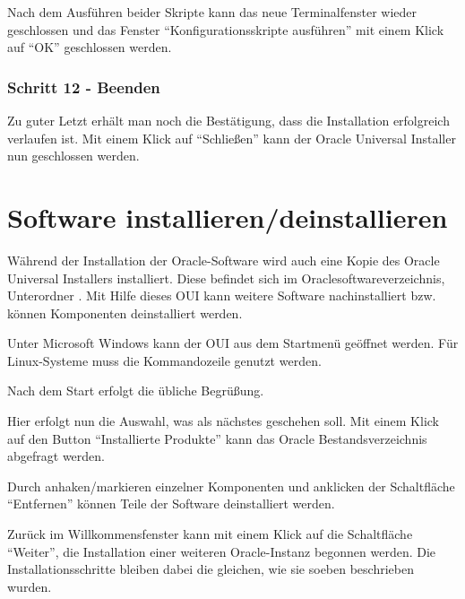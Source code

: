           Nach dem Ausführen beider Skripte kann das neue Terminalfenster wieder geschlossen und das Fenster \enquote{Konfigurationsskripte ausführen} mit einem Klick auf \enquote{OK} geschlossen werden.


\clearpage
        \subsubsection{Schritt 12 - Beenden}
          Zu guter Letzt erhält man noch die Bestätigung, dass die Installation erfolgreich verlaufen ist. Mit einem Klick auf \enquote{Schließen} kann der Oracle Universal Installer nun geschlossen werden.
    \section{Software installieren/deinstallieren}
      Während der Installation der Oracle-Software wird auch eine Kopie des Oracle Universal Installers installiert. Diese befindet sich im Oraclesoftwareverzeichnis, Unterordner . Mit Hilfe dieses OUI kann weitere Software nachinstalliert bzw. können Komponenten deinstalliert werden.

      Unter Microsoft Windows kann der OUI aus dem Startmenü geöffnet werden. Für Linux-Systeme muss die Kommandozeile genutzt werden.


      Nach dem Start erfolgt die übliche Begrüßung.

      Hier erfolgt nun die Auswahl, was als nächstes geschehen soll. Mit einem Klick auf den Button \enquote{Installierte Produkte} kann das Oracle Bestandsverzeichnis abgefragt werden.

      Durch anhaken/markieren einzelner Komponenten und anklicken der Schaltfläche \enquote{Entfernen} können Teile der Software deinstalliert werden.

      Zurück im Willkommensfenster kann mit einem Klick auf die Schaltfläche \enquote{Weiter}, die Installation einer weiteren Oracle-Instanz begonnen werden. Die Installationsschritte bleiben dabei die gleichen, wie sie soeben beschrieben wurden.
\clearpage
